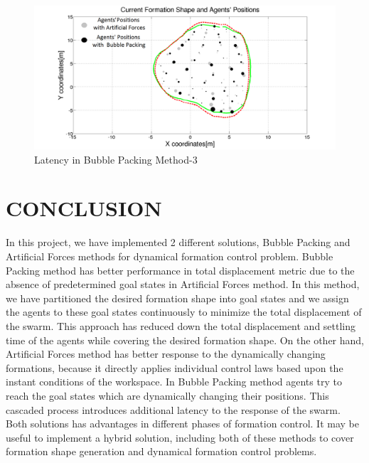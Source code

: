 \documentclass[letterpaper, 10 pt, conference]{ieeeconf}  %
\begin{document}
\begin{figure}[thpb]
\caption{Latency in Bubble Packing Method-3} \label{combo3_ref}
\centerline{\includegraphics[scale = 0.17]{combo3}}
\end{figure}

\section{CONCLUSION}
In this project, we have implemented 2 different solutions, Bubble Packing and Artificial Forces methods for dynamical formation control problem. Bubble Packing method has better performance in total displacement metric due to the absence of predetermined goal states in Artificial Forces method. In this method, we have partitioned the desired formation shape into goal states and we assign the agents to these goal states continuously to minimize the total displacement of the swarm. This approach has reduced down the total displacement and settling time of the agents while covering the desired formation shape.
On the other hand, Artificial Forces method has better response to the dynamically changing formations, because it directly applies individual control laws based upon the instant conditions of the workspace. In Bubble Packing method agents try to reach the goal states which are dynamically changing their positions. This cascaded process introduces additional latency to the response of the swarm. Both solutions has advantages in different phases of formation control. It may be useful to implement a hybrid solution, including both of these methods to cover formation shape generation and dynamical formation control problems. 




%

\end{document}
